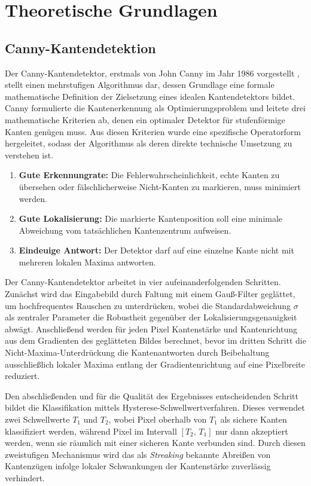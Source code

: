 \chapter{Theoretische Grundlagen}

\section{Canny-Kantendetektion}

Der Canny-Kantendetektor, erstmals von John Canny im Jahr 1986 vorgestellt \cite{canny_computational_1986}, stellt einen mehrstufigen Algorithmus dar, dessen Grundlage eine formale mathematische Definition der Zielsetzung eines idealen Kantendetektors bildet. Canny formulierte die Kantenerkennung als Optimierungsproblem und leitete drei mathematische Kriterien ab, denen ein optimaler Detektor für stufenförmige Kanten genügen muss. Aus diesen Kriterien wurde eine spezifische Operatorform hergeleitet, sodass der Algorithmus als deren direkte technische Umsetzung zu verstehen ist.

\begin{enumerate}
  \item \textbf{Gute Erkennungrate:}  Die Fehlerwahrscheinlichkeit, echte Kanten zu übersehen oder fälschlicherweise Nicht-Kanten zu markieren, muss minimiert werden.
  \item \textbf{Gute Lokalisierung:} Die markierte Kantenposition soll eine minimale Abweichung vom tatsächlichen Kantenzentrum aufweisen.
  \item \textbf{Eindeuige Antwort:} Der Detektor darf auf eine einzelne Kante nicht mit mehreren lokalen Maxima antworten.
\end{enumerate}

Der Canny-Kantendetektor arbeitet in vier aufeinanderfolgenden Schritten. Zunächst wird das Eingabebild durch Faltung mit einem Gauß-Filter geglättet, um hochfrequentes Rauschen zu unterdrücken, wobei die Standardabweichung $\sigma$ als zentraler Parameter die Robustheit gegenüber der Lokalisierungsgenauigkeit abwägt. Anschließend werden für jeden Pixel Kantenstärke und Kantenrichtung aus dem Gradienten des geglätteten Bildes berechnet, bevor im dritten Schritt die Nicht-Maxima-Unterdrückung die Kantenantworten durch Beibehaltung ausschließlich lokaler Maxima entlang der
Gradientenrichtung auf eine Pixelbreite reduziert.

Den abschließenden und für die Qualität des Ergebnisses entscheidenden Schritt bildet die Klassifikation mittels Hysterese-Schwellwertverfahren. Dieses verwendet zwei Schwellwerte $T_1$ und $T_2$, wobei Pixel oberhalb von $T_1$ als sichere Kanten klassifiziert werden, während Pixel im Intervall $[T_2,\, T_1]$ nur dann akzeptiert werden, wenn sie räumlich mit einer sicheren Kante verbunden sind. Durch diesen zweistufigen Mechanismus wird das als \textit{Streaking} bekannte Abreißen von Kantenzügen infolge lokaler Schwankungen der Kantenstärke zuverlässig verhindert.

